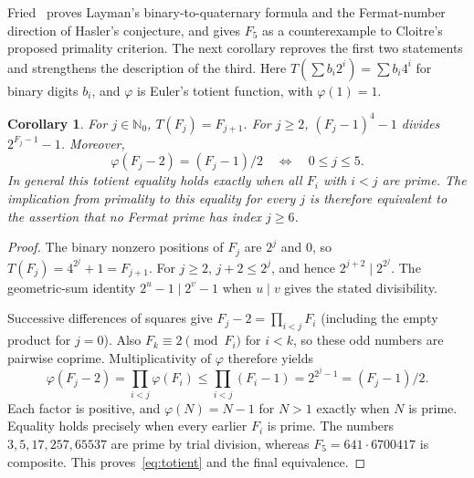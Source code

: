 \documentclass[11pt]{article}
\newtheorem{corollary}{Corollary}
\newcommand{\N}{\mathbb{N}_0}
\begin{document}
Fried~\cite{fried} proves Layman's binary-to-quaternary formula and the
Fermat-number direction of Hasler's conjecture, and gives $F_5$ as a
counterexample to Cloitre's proposed primality criterion. The next corollary
reproves the first two statements and strengthens the description of the third.
Here $T(\sum b_i2^i)=\sum b_i4^i$ for binary digits $b_i$, and $\varphi$
is Euler's totient function, with $\varphi(1)=1$.
\begin{corollary}\label{cor:fermat}
For $j\in\N$, $T(F_j)=F_{j+1}$. For $j\geq2$,
$(F_j-1)^4-1$ divides $2^{F_j-1}-1$. Moreover,
\begin{equation}\label{eq:totient}
 \varphi(F_j-2)=(F_j-1)/2\quad\Longleftrightarrow\quad 0\leq j\leq5.
\end{equation}
In general this totient equality holds exactly when all $F_i$ with $i<j$
are prime. The implication from primality to this equality for every $j$
is therefore equivalent to the assertion that no Fermat prime has index
$j\geq6$.
\end{corollary}
\begin{proof}
The binary nonzero positions of $F_j$ are $2^j$ and 0, so
$T(F_j)=4^{2^j}+1=F_{j+1}$.
For $j\geq2$, $j+2\leq2^j$, and hence
$2^{j+2}\mid2^{2^j}$. The geometric-sum identity
$2^u-1\mid2^v-1$ when $u\mid v$ gives the stated divisibility.

Successive differences of squares give
$F_j-2=\prod_{i<j}F_i$ (including the empty product for $j=0$).
Also $F_k\equiv2\pmod{F_i}$ for $i<k$, so these odd numbers are
pairwise coprime. Multiplicativity of $\varphi$ therefore yields
\[
 \varphi(F_j-2)=\prod_{i<j}\varphi(F_i)
 \leq\prod_{i<j}(F_i-1)=2^{2^j-1}=(F_j-1)/2.
\]
Each factor is positive, and $\varphi(N)=N-1$ for $N>1$ exactly when
$N$ is prime. Equality holds precisely when every earlier $F_i$ is prime.
The numbers $3,5,17,257,65537$ are prime by trial division, whereas
$F_5=641\cdot6700417$ is composite. This proves~\eqref{eq:totient}
and the final equivalence.
\end{proof}
\end{document}
